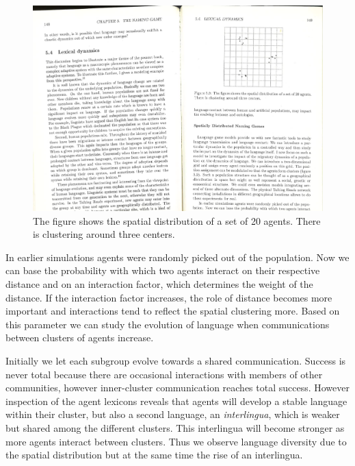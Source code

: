 \begin{figure}[htbp]
  \centerline{\includegraphics[width=.40
\textwidth]{chap5/figs/fig-agent-distribution.pdf}}
\caption{The figure shows the spatial distribution of a set
of 20 agents. There is clustering around three centers.}
\label{figure-agent-distribution}
\end{figure}

In earlier simulations agents were randomly picked
out of the population. 
Now we can base the probability with which two agents interact
on their respective distance and on an
interaction factor, which determines the weight
of the distance. If the interaction factor increases, the
role of distance becomes more important and interactions tend to
reflect the spatial clustering more. Based on this
parameter we can study the evolution of
language when communications between clusters of agents 
increase. 

Initially we let each subgroup evolve towards a shared 
communication. 
Success is never total because there are occasional interactions
with members of other communities, however inner-cluster
communication reaches total success.
However inspection of the agent lexicons reveals that
agents will develop a stable
language within their cluster, but also a
second language, an {\itshape interlingua}, which is weaker but
shared among the different clusters. This interlingua will
become stronger as more agents interact between clusters.
Thus we observe language diversity due to
the spatial distribution but at the same time the rise 
of an interlingua.

